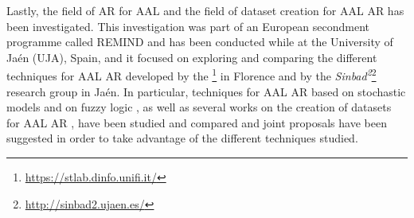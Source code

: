   Lastly, the field of \ac{AR} \cite{chen2011activity,patterson2003inferring,turaga2008machine} for \ac{AAL} \cite{cook2009ambient} and the field of dataset creation for \ac{AAL} \ac{AR} has been investigated. This investigation was part of an European secondment programme called REMIND and has been conducted while at the University of Jaén (\ac{UJA}), Spain, and it focused on exploring and comparing the different techniques for \ac{AAL} \ac{AR} developed by the \textit{}\footnote{\url{https://stlab.dinfo.unifi.it/}} in Florence and by the \textit{Sinbad\textsuperscript{2}}\footnote{\url{http://sinbad2.ujaen.es/}} research group in Jaén. In particular, techniques for \ac{AAL} \ac{AR} based on stochastic models \cite{biagi2016stochastic,carnevali2015continuous} and on fuzzy logic \cite{medina2015activity}, as well as several works on the creation of datasets for \ac{AAL} \ac{AR} \cite{patara2015recommendations,quesada2015generation}, have been studied and compared and joint proposals have been suggested in order to take advantage of the different techniques studied.
  
\newpage
